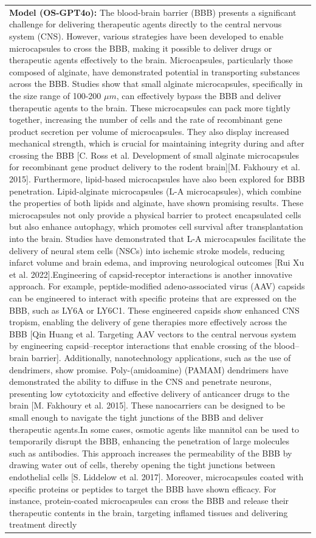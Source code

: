 \begin{table}[t!]
\begin{tabular}{p{15cm}}
{\bf Model (OS-GPT4o):} The blood-brain barrier (BBB) presents a significant challenge for delivering therapeutic agents directly to the central nervous system (CNS). However, various strategies have been developed to enable microcapsules to cross the BBB, making it possible to deliver drugs or therapeutic agents effectively to the brain. Microcapsules, particularly those composed of alginate, have demonstrated potential in transporting substances across the BBB. Studies show that small alginate microcapsules, specifically in the size range of 100-200 $\mu m$, can effectively bypass the BBB and deliver therapeutic agents to the brain. These microcapsules can pack more tightly together, increasing the number of cells and the rate of recombinant gene product secretion per volume of microcapsules. They also display increased mechanical strength, which is crucial for maintaining integrity during and after crossing the BBB [C. Ross et al. Development of small alginate microcapsules for recombinant gene product delivery to the rodent brain][M. Fakhoury et al. 2015]. Furthermore, lipid-based microcapsules have also been explored for BBB penetration. Lipid-alginate microcapsules (L-A microcapsules), which combine the properties of both lipids and alginate, have shown promising results. These microcapsules not only provide a physical barrier to protect encapsulated cells but also enhance autophagy, which promotes cell survival after transplantation into the brain. Studies have demonstrated that L-A microcapsules facilitate the delivery of neural stem cells (NSCs) into ischemic stroke models, reducing infarct volume and brain edema, and improving neurological outcomes [Rui Xu et al. 2022].Engineering of capsid-receptor interactions is another innovative approach. For example, peptide-modified adeno-associated virus (AAV) capsids can be engineered to interact with specific proteins that are expressed on the BBB, such as LY6A or LY6C1. These engineered capsids show enhanced CNS tropism, enabling the delivery of gene therapies more effectively across the BBB [Qin Huang et al. Targeting AAV vectors to the central nervous system by engineering capsid–receptor interactions that enable crossing of the blood–brain barrier]. Additionally, nanotechnology applications, such as the use of dendrimers, show promise. Poly-(amidoamine) (PAMAM) dendrimers have demonstrated the ability to diffuse in the CNS and penetrate neurons, presenting low cytotoxicity and effective delivery of anticancer drugs to the brain [M. Fakhoury et al. 2015]. These nanocarriers can be designed to be small enough to navigate the tight junctions of the BBB and deliver therapeutic agents.In some cases, osmotic agents like mannitol can be used to temporarily disrupt the BBB, enhancing the penetration of large molecules such as antibodies. This approach increases the permeability of the BBB by drawing water out of cells, thereby opening the tight junctions between endothelial cells [S. Liddelow et al. 2017]. Moreover, microcapsules coated with specific proteins or peptides to target the BBB have shown efficacy. For instance, protein-coated microcapsules can cross the BBB and release their therapeutic contents in the brain, targeting inflamed tissues and delivering treatment directly 
\end{tabular}
\end{table}
